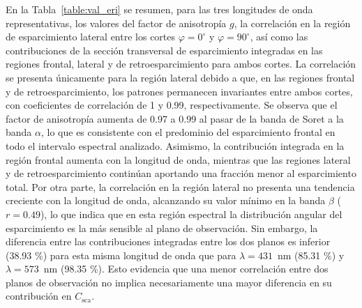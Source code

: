 	
	

En la Tabla~\ref{table:val_eri} se resumen, para las tres longitudes de onda representativas, los valores del factor de anisotropía $g$, la correlación en la región de esparcimiento lateral entre los cortes $\varphi=0^\circ$ y $\varphi=90^\circ$, así como las contribuciones de la sección transversal de esparcimiento integradas en las regiones frontal, lateral y de retroesparcimiento para ambos cortes. La correlación se presenta únicamente para la región lateral debido a que, en las regiones frontal y de retroesparcimiento, los patrones permanecen invariantes entre ambos cortes, con coeficientes de correlación de 1 y 0.99, respectivamente. Se observa que el factor de anisotropía aumenta de 0.97 a 0.99 al pasar de la banda de Soret a la banda $\alpha$, lo que es consistente con el predominio del esparcimiento frontal en todo el intervalo espectral analizado. Asimismo, la contribución integrada en la región frontal aumenta con la longitud de onda, mientras que las regiones lateral y de retroesparcimiento continúan aportando una fracción menor al esparcimiento total. Por otra parte, la correlación en la región lateral no presenta una tendencia creciente con la longitud de onda, alcanzando su valor mínimo en la banda $\beta$ ($r=0.49$), lo que indica que en esta región espectral la distribución angular del esparcimiento es la más sensible al plano de observación. Sin embargo, la diferencia entre las contribuciones integradas entre los dos planos es inferior (38.93 \%) para esta misma longitud de onda que para $\lambda=431$~nm (85.31 \%) y $\lambda=573$~nm (98.35 \%). Esto evidencia que una menor correlación entre dos planos de observación no implica necesariamente una mayor diferencia en su contribución en $C_{\text{sca}}$.

